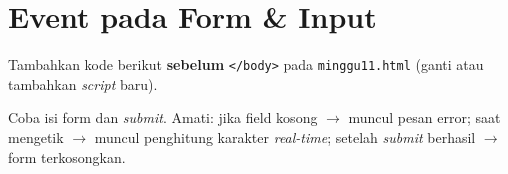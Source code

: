\section{Event pada Form \& Input}
\label{sec:11-form-event}

\begin{langkah}
  \item Tambahkan kode berikut \textbf{sebelum} \texttt{</body>} pada \texttt{minggu11.html} (ganti atau tambahkan \emph{script} baru).
  \item Coba isi form dan \emph{submit}. Amati: jika field kosong $\rightarrow$ muncul pesan error; saat mengetik $\rightarrow$ muncul penghitung karakter \emph{real-time}; setelah \emph{submit} berhasil $\rightarrow$ form terkosongkan.
\end{langkah}

